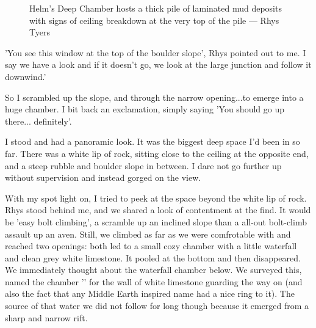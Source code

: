 \begin{figure}[t!]
\checkoddpage \ifoddpage \forcerectofloat \else \forceversofloat \fi
\centering
{}
\caption{Helm's Deep Chamber hosts a thick pile of laminated mud deposits with signs of ceiling breakdown at the very top of the pile --- Rhys Tyers}
\label{helmsdeeo}
\end{figure}

'You see this window at the top of the boulder slope', Rhys pointed out to me. I say we have a look and if it doesn't go, we look at the large junction and follow it downwind.' 

So I scrambled up the slope, and through the narrow opening...to emerge into a huge chamber. I bit back an exclamation, simply saying 'You should go up there... definitely'. 

I stood and had a panoramic look. It was the biggest deep space I'd been in so far. There was a white lip of rock, sitting close to the ceiling at the opposite end, and a steep rubble and boulder slope in between. I dare not go further up without supervision and instead gorged on the view. 

With my spot light on, I tried to peek at the space beyond the white lip of rock. Rhys stood behind me, and we shared a look of contentment at the find. It would be 'easy bolt climbing', a scramble up an inclined slope than a all-out bolt-climb assault up an aven. Still, we climbed as far as we were comfrotable with and reached two openings: both led to a small cozy chamber with a little waterfall and clean grey white limestone. It pooled at the bottom and then disappeared. We immediately thought about the waterfall chamber below. We surveyed this, named the chamber '' for the wall of white limestone guarding the way on (and also the fact that any Middle Earth inspired name had a nice ring to it). The source of that water we did not follow for long though because it emerged from a sharp and narrow rift. 

